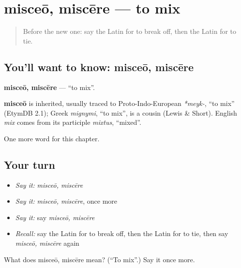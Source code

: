 \section[misceō, miscēre]{misceō, miscēre — to mix}

\label{lesson:LA-C233-misceo}



\begin{quote}
Before the new one: say the Latin for to break off, then the Latin for to tie.
\end{quote}

\subsection*{You'll want to know: misceō, miscēre}
\textbf{misceō, miscēre} — \textquotedblleft{}to mix\textquotedblright{}.

\begin{cousinweb}
\textbf{misceō} is inherited, usually traced to Proto-Indo-European \emph{*meyk-}, \textquotedblleft{}to mix\textquotedblright{} (EtymDB 2.1); Greek \emph{mignymi}, \textquotedblleft{}to mix\textquotedblright{}, is a cousin (Lewis \& Short). English \emph{mix} comes from its participle \emph{mixtus}, \textquotedblleft{}mixed\textquotedblright{}.
\end{cousinweb}

\begin{grammarlens}[title={What you've built}]
One more word for this chapter.
\end{grammarlens}

\subsection*{Your turn}
\begin{itemize}
\raggedright
  \item \emph{Say it:} \emph{misceō, miscēre}
  \item \emph{Say it:} \emph{misceō, miscēre}, once more
  \item \emph{Say it:} say \emph{misceō, miscēre}
  \item \emph{Recall:} say the Latin for to break off, then the Latin for to tie, then say \emph{misceō, miscēre} again
\end{itemize}

\begin{tcolorbox}[breakable,colback=teal!4,colframe=teal!35!black,title={Before you move on}]
What does misceō, miscēre mean? (\textquotedblleft{}To mix\textquotedblright{}.) Say it once more.
\end{tcolorbox}

